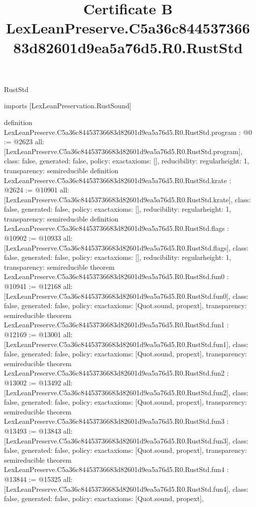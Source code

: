 \begin{lexlean}{RustStd}
\title{Certificate B LexLeanPreserve.C5a36c84453736683d82601d9ea5a76d5.R0.RustStd}
\begin{coremodule}
imports [LexLeanPreservation.RustSound]

definition LexLeanPreserve.C5a36c84453736683d82601d9ea5a76d5.R0.RustStd.program : @0 := @2623 {
  all: [LexLeanPreserve.C5a36c84453736683d82601d9ea5a76d5.R0.RustStd.program],
  class: false,
  generated: false,
  policy: exact{axioms: []},
  reducibility: regular{height: 1},
  transparency: semireducible
}
definition LexLeanPreserve.C5a36c84453736683d82601d9ea5a76d5.R0.RustStd.krate : @2624 := @10901 {
  all: [LexLeanPreserve.C5a36c84453736683d82601d9ea5a76d5.R0.RustStd.krate],
  class: false,
  generated: false,
  policy: exact{axioms: []},
  reducibility: regular{height: 1},
  transparency: semireducible
}
definition LexLeanPreserve.C5a36c84453736683d82601d9ea5a76d5.R0.RustStd.flags : @10902 := @10933 {
  all: [LexLeanPreserve.C5a36c84453736683d82601d9ea5a76d5.R0.RustStd.flags],
  class: false,
  generated: false,
  policy: exact{axioms: []},
  reducibility: regular{height: 1},
  transparency: semireducible
}
theorem LexLeanPreserve.C5a36c84453736683d82601d9ea5a76d5.R0.RustStd.fun0 : @10941 := @12168 {
  all: [LexLeanPreserve.C5a36c84453736683d82601d9ea5a76d5.R0.RustStd.fun0],
  class: false,
  generated: false,
  policy: exact{axioms: [Quot.sound, propext]},
  transparency: semireducible
}
theorem LexLeanPreserve.C5a36c84453736683d82601d9ea5a76d5.R0.RustStd.fun1 : @12169 := @13001 {
  all: [LexLeanPreserve.C5a36c84453736683d82601d9ea5a76d5.R0.RustStd.fun1],
  class: false,
  generated: false,
  policy: exact{axioms: [Quot.sound, propext]},
  transparency: semireducible
}
theorem LexLeanPreserve.C5a36c84453736683d82601d9ea5a76d5.R0.RustStd.fun2 : @13002 := @13492 {
  all: [LexLeanPreserve.C5a36c84453736683d82601d9ea5a76d5.R0.RustStd.fun2],
  class: false,
  generated: false,
  policy: exact{axioms: [Quot.sound, propext]},
  transparency: semireducible
}
theorem LexLeanPreserve.C5a36c84453736683d82601d9ea5a76d5.R0.RustStd.fun3 : @13493 := @13843 {
  all: [LexLeanPreserve.C5a36c84453736683d82601d9ea5a76d5.R0.RustStd.fun3],
  class: false,
  generated: false,
  policy: exact{axioms: [Quot.sound, propext]},
  transparency: semireducible
}
theorem LexLeanPreserve.C5a36c84453736683d82601d9ea5a76d5.R0.RustStd.fun4 : @13844 := @15325 {
  all: [LexLeanPreserve.C5a36c84453736683d82601d9ea5a76d5.R0.RustStd.fun4],
  class: false,
  generated: false,
  policy: exact{axioms: [Quot.sound, propext]},
}
\end{coremodule}
\end{lexlean}
